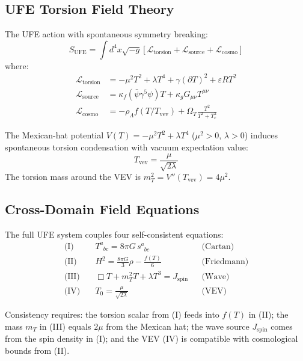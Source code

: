 \documentclass[twocolumn,prd,superscriptaddress,nofootinbib]{revtex4-2}
\begin{document}
\subsection{UFE Torsion Field Theory}

The UFE action with spontaneous symmetry breaking:
\begin{equation}
S_\text{UFE} = \int d^4x \sqrt{-g}\left[\mathcal{L}_\text{torsion} + \mathcal{L}_\text{source} + \mathcal{L}_\text{cosmo}\right]
\label{eq:action}
\end{equation}
where:
\begin{align}
\mathcal{L}_\text{torsion} &= -\mu^2 T^2 + \lambda T^4 + \gamma(\partial T)^2 + \varepsilon R T^2 \label{eq:L_torsion}\\
\mathcal{L}_\text{source} &= \kappa_f(\bar{\psi}\gamma^5\psi)T + \kappa_g G_{\mu\nu}T^{\mu\nu} \label{eq:L_source}\\
\mathcal{L}_\text{cosmo} &= -\rho_\Lambda f(T/T_\text{vev}) + \Omega_T \frac{T^2}{T^2 + T_c^2} \label{eq:L_cosmo}
\end{align}

The Mexican-hat potential $V(T) = -\mu^2 T^2 + \lambda T^4$ ($\mu^2 > 0$, $\lambda > 0$) induces spontaneous torsion condensation with vacuum expectation value:
\begin{equation}
T_\text{vev} = \frac{\mu}{\sqrt{2\lambda}}
\label{eq:vev}
\end{equation}
The torsion mass around the VEV is $m_T^2 = V''(T_\text{vev}) = 4\mu^2$.

\subsection{Cross-Domain Field Equations}

The full UFE system couples four self-consistent equations:
\begin{align}
\text{(I)} &\quad T^a_{\phantom{a}bc} = 8\pi G\, s^a_{\phantom{a}bc} && \text{(Cartan)} \label{eq:cartan}\\
\text{(II)} &\quad H^2 = \frac{8\pi G}{3}\rho - \frac{f(T)}{6} && \text{(Friedmann)} \label{eq:friedmann2}\\
\text{(III)} &\quad \Box T + m_T^2 T + \lambda T^3 = J_\text{spin} && \text{(Wave)} \label{eq:wave}\\
\text{(IV)} &\quad T_0 = \frac{\mu}{\sqrt{2\lambda}} && \text{(VEV)} \label{eq:vev2}
\end{align}

Consistency requires: the torsion scalar from (I) feeds into $f(T)$ in (II); the mass $m_T$ in (III) equals $2\mu$ from the Mexican hat; the wave source $J_\text{spin}$ comes from the spin density in (I); and the VEV (IV) is compatible with cosmological bounds from (II).
\end{document}
